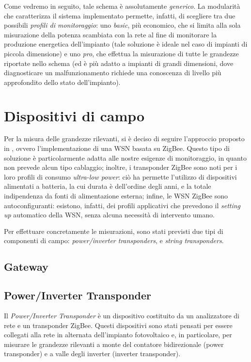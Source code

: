 %
Come vedremo in seguito, tale schema \`e assolutamente \emph{generico}. 
%
La modularit\`a che caratterizza il sistema implementato permette, infatti, 
di scegliere tra due possibili \emph{profili di monitoraggio}: uno \emph{basic}, 
pi\`u economico, che si limita alla sola misurazione della potenza scambiata con 
la rete al fine di monitorare la produzione energetica dell'impianto (tale soluzione 
\`e ideale nel caso di impianti di piccola dimensione) e uno \emph{pro}, che effettua 
la misurazione di tutte le grandezze riportate nello schema (ed \`e pi\`u adatto a 
impianti di grandi dimensioni, dove diagnosticare un malfunzionamento richiede 
una conoscenza di livello pi\`u approfondito dello stato dell'impianto).
%

%
\section{Dispositivi di campo}
Per la misura delle grandezze rilevanti, si \`e deciso di seguire l'approccio
proposto in \cite{xiaoli11}, ovvero l'implementazione di una WSN basata 
su ZigBee. 
%
Questo tipo di soluzione \`e particolarmente adatta alle nostre esigenze di 
monitoraggio, in quanto non prevede alcun tipo cablaggio; inoltre, i transponder 
ZigBee sono noti per i loro profili di consumo \emph{ultra-low power}: 
ci\`o ha permette l'utilizzo di dispositivi alimentati a batteria, la cui 
durata \`e dell'ordine degli anni, e la totale indipendenza da fonti di 
alimentazione esterna; infine, le WSN ZigBee sono autoconfiguranti: esistono,
infatti, dei profili applicativi che prevedono il \emph{setting up} automatico 
della WSN, senza alcuna necessit\`a di intervento umano.
%

%
Per effettuare concretamente le misurazioni, sono stati previsti due tipi di 
componenti di campo: \emph{power/inverter transponders}, e \emph{string transponders}.

\subsection{Gateway}

%

%
\subsection{Power/Inverter Transponder}
%
Il \emph{Power/Inverter Transponder} \`e un dispositivo costituito da  un 
analizzatore di rete e  un transponder ZigBee.
%
Questi dispositivi sono stati pensati per essere collegati alla rete in alternata 
dell'impianto fotovoltaico e, in particolare, per misurare le grandezze rilevanti 
a monte del contatore bidirezionale (power transponder) e a valle degli inverter 
(inverter transponder).
%

